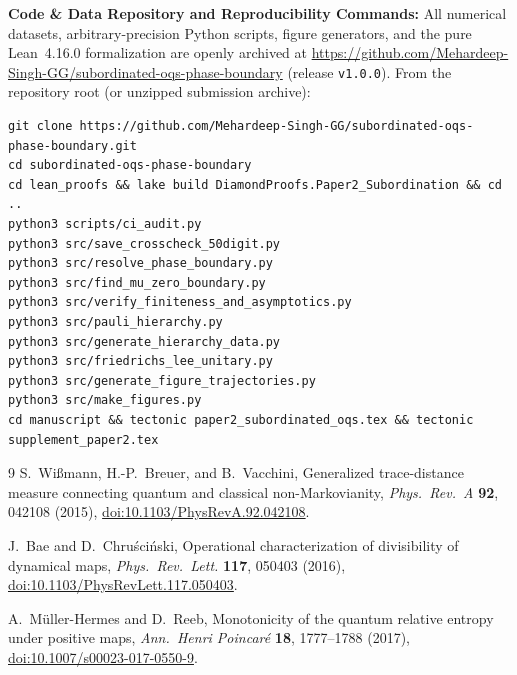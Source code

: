 \documentclass[onecolumn,10pt,notitlepage,amsmath,amssymb,floatfix]{revtex4-2}
\theoremstyle{plain}
\theoremstyle{definition}
\begin{document}
\textbf{Code \& Data Repository and Reproducibility Commands:} All numerical datasets, arbitrary-precision Python scripts, figure generators, and the pure Lean~4.16.0 formalization are openly archived at \url{https://github.com/Mehardeep-Singh-GG/subordinated-oqs-phase-boundary} (release \texttt{v1.0.0}). From the repository root (or unzipped submission archive):
\begin{verbatim}
git clone https://github.com/Mehardeep-Singh-GG/subordinated-oqs-phase-boundary.git
cd subordinated-oqs-phase-boundary
cd lean_proofs && lake build DiamondProofs.Paper2_Subordination && cd ..
python3 scripts/ci_audit.py
python3 src/save_crosscheck_50digit.py
python3 src/resolve_phase_boundary.py
python3 src/find_mu_zero_boundary.py
python3 src/verify_finiteness_and_asymptotics.py
python3 src/pauli_hierarchy.py
python3 src/generate_hierarchy_data.py
python3 src/friedrichs_lee_unitary.py
python3 src/generate_figure_trajectories.py
python3 src/make_figures.py
cd manuscript && tectonic paper2_subordinated_oqs.tex && tectonic supplement_paper2.tex
\end{verbatim}

{\raggedright
\begin{thebibliography}{9}
S.~Wi\ss mann, H.-P.~Breuer, and B.~Vacchini,
Generalized trace-distance measure connecting quantum and classical non-Markovianity,
\emph{Phys.\ Rev.\ A} \textbf{92}, 042108 (2015),
\href{https://doi.org/10.1103/PhysRevA.92.042108}{doi:10.1103/PhysRevA.92.042108}.

J.~Bae and D.~Chru\'sci\'nski,
Operational characterization of divisibility of dynamical maps,
\emph{Phys.\ Rev.\ Lett.} \textbf{117}, 050403 (2016),
\href{https://doi.org/10.1103/PhysRevLett.117.050403}{doi:10.1103/PhysRevLett.117.050403}.

A.~M\"uller-Hermes and D.~Reeb,
Monotonicity of the quantum relative entropy under positive maps,
\emph{Ann.\ Henri Poincar\'e} \textbf{18}, 1777--1788 (2017),
\href{https://doi.org/10.1007/s00023-017-0550-9}{doi:10.1007/s00023-017-0550-9}.
\end{thebibliography}
}
\end{document}
